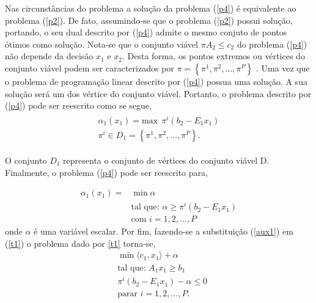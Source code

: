 Nas circunst\^ancias do problema a solu\c c\~ao da problema (\ref{p4}) \'e equivalente ao problema (\ref{p2}). De fato, 
assumindo-se que o problema (\ref{p2}) possui solu\c c\~ao, portando, o seu dual descrito por (\ref{p4}) admite o mesmo
conjuto de pontos \'otimos como solu\c c\~ao\cite{alexey}.
Nota-se que o conjunto vi\'avel $\pi A_2 \leq c_2$ do problema (\ref{p4}) n\~ao depende da decis\~ao $x_1$ e $x_2$. Desta forma, os
pontos extremos ou v\'ertices do conjunto vi\'avel podem ser caracterizados por $\pi = \left\{ \pi^1, \pi^2, \dots,
\pi^P \right\}$ \cite{cp}. Uma vez
que o problema de programa\c c\~ao linear descrito por (\ref{p4}) possua uma solu\c c\~ao. A sua solu\c c\~ao ser\'a  
um dos v\'ertice do conjunto vi\'avel\cite{alexey}.
Portanto, o problema descrito por (\ref{p4}) pode ser reescrito como se segue,
\begin{align*}
  \begin{aligned}
	{\alpha}_{1}(x_1) = \text {max} \ \ {\pi}^{i} (b_2 - E_1x_1) \\
	{\pi}^{i} \in  D_1 = \left\{ {\pi}^{1}, {\pi}^{2},\dots, {\pi}^{P} \right\}.
  \end{aligned}
\end{align*}

O conjunto $D_1$ representa o conjunto de v\'ertices do conjunto vi\'avel D.
Finalmente, o problema (\ref{p4}) pode ser reescrito para, 

\begin{align}
	\label{aux1}
  	\alpha_{1}(x_1) =& \min\alpha \nonumber \\ 
	&\mbox{tal que: }\alpha \geq \pi^{i}(b_2 - E_1 x_1) \\
	&\mbox{com } i = 1,2, \dots , P \nonumber
\end{align}
onde $\alpha$ \'e uma vari\'avel escalar. Por fim, fazendo-se a substitui\c c\~ao (\ref{aux1}) em (\ref{t1}) o problema
dado por \ref{t1} torna-se,
\begin{align}
	\label{fin1}
&\min \langle c_1,x_1\rangle + \alpha \nonumber\\
&\mbox{tal que: }	A_1 x_1 \geq b_1 \\
&	\pi^{i}(b_2 - E_1x_1) - \alpha \leq 0\nonumber \\ 
&\mbox{parar }	i = 1, 2, \dots , P.\nonumber
\end{align}

